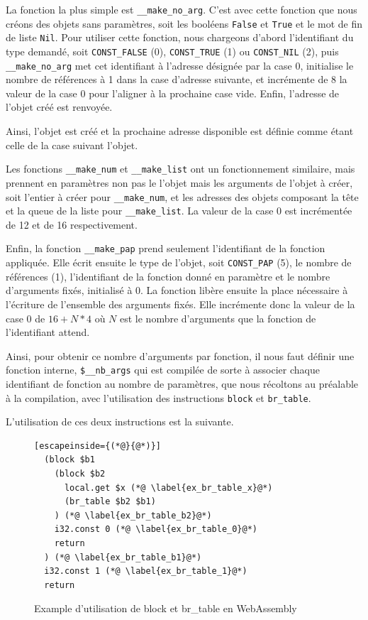 \documentclass{rapportECL}
\begin{document}
\bigskip

La fonction la plus simple est \verb|__make_no_arg|. C'est avec cette fonction que nous créons des objets sans paramètres,
soit les booléens \verb|False| et \verb|True| et le mot de fin de liste \verb|Nil|. Pour utiliser cette fonction,
nous chargeons d'abord l'identifiant du type demandé, soit \verb|CONST_FALSE| (0), \verb|CONST_TRUE| (1) ou \verb|CONST_NIL| (2),
puis \verb|__make_no_arg| met cet identifiant à l'adresse désignée par la case 0, initialise le nombre de références à 1 dans la
case d'adresse suivante, et incrémente de 8 la valeur de la case 0 pour l'aligner à la prochaine case vide. 
Enfin, l'adresse de l'objet créé est renvoyée.

Ainsi, l'objet est créé et la prochaine adresse disponible est définie comme étant celle de la case suivant l'objet.

\bigskip

Les fonctions \verb|__make_num| et \verb|__make_list| ont un fonctionnement similaire, mais prennent en paramètres non pas le 
l'objet mais les arguments de l'objet à créer, soit l'entier à créer pour \verb|__make_num|, et les adresses des objets composant la tête et la 
queue de la liste pour \verb|__make_list|. La valeur de la case 0 est incrémentée de 12 et de 16 respectivement.

\bigskip

Enfin, la fonction \verb|__make_pap| prend seulement l'identifiant de la fonction appliquée. Elle écrit ensuite le type de l'objet, 
soit \verb|CONST_PAP| (5), le nombre de références (1), l'identifiant de la fonction donné en paramètre et le nombre d'arguments 
fixés, initialisé à 0. La fonction libère ensuite la place nécessaire à l'écriture de l'ensemble des arguments fixés.
Elle incrémente donc la valeur de la case 0 de $16 + N * 4 $ où $N$ est le nombre d'arguments que la fonction de l'identifiant attend.

Ainsi, pour obtenir ce nombre d'arguments par fonction, il nous faut définir une fonction interne, \verb|$__nb_args| qui est 
compilée de sorte à associer chaque identifiant de fonction au nombre de paramètres, que nous récoltons au préalable à la 
compilation, avec l'utilisation des instructions \verb|block| et \verb|br_table|.

L'utilisation de ces deux instructions est la suivante.

\begin{figure}[H]
	\begin{lstlisting}[escapeinside={(*@}{@*)}]
  (block $b1
    (block $b2
      local.get $x (*@ \label{ex_br_table_x}@*)
      (br_table $b2 $b1)
    ) (*@ \label{ex_br_table_b2}@*)
    i32.const 0 (*@ \label{ex_br_table_0}@*)
    return
  ) (*@ \label{ex_br_table_b1}@*)
  i32.const 1 (*@ \label{ex_br_table_1}@*)
  return
	\end{lstlisting}
	\caption{Example d'utilisation de block et br\_table en WebAssembly}
	\label{listing:example_block_br_table}
\end{figure}
\end{document}
